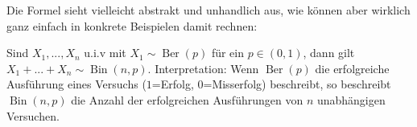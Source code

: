 Die Formel sieht vielleicht abstrakt und unhandlich aus, wie k\"onnen aber wirklich ganz einfach in konkrete Beispielen damit rechnen:



\begin{beispiel}
	Sind $X_1,...,X_n$ u.i.v mit $X_1 \sim \operatorname{Ber}(p)$ f\"ur ein $p\in (0,1)$, dann gilt $X_1+...+X_n \sim \operatorname{Bin}(n,p)$. Interpretation: Wenn $\operatorname{Ber}(p)$ die erfolgreiche Ausf\"uhrung eines Versuchs ($1$=Erfolg, $0$=Misserfolg) beschreibt, so beschreibt $\operatorname{Bin}(n,p)$ die Anzahl der erfolgreichen Ausf\"uhrungen von $n$ unabhängigen Versuchen.
\end{beispiel}

